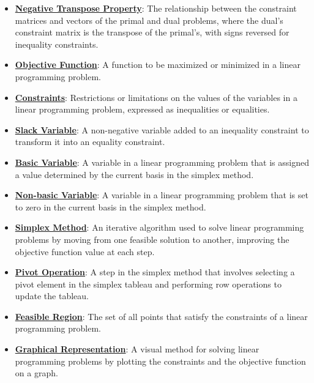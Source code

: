 \documentclass{article}%
\begin{document}
\begin{itemize}[leftmargin=*]
\item \href{https://www.math.purdue.edu/~yipn/421/2024-09-19-DualityExamples.pdf#page=1}{\textbf{Negative Transpose Property}}: The relationship between the constraint matrices and vectors of the primal and dual problems, where the dual's constraint matrix is the transpose of the primal's, with signs reversed for inequality constraints.%
\item \href{https://www.math.purdue.edu/~yipn/421/2024-09-24-SimplexMatrix.pdf#page=1}{\textbf{Objective Function}}: A function to be maximized or minimized in a linear programming problem. %
\item \href{https://www.math.purdue.edu/~yipn/421/2024-09-24-SimplexMatrix.pdf#page=1}{\textbf{Constraints}}: Restrictions or limitations on the values of the variables in a linear programming problem, expressed as inequalities or equalities. %
\item \href{https://www.math.purdue.edu/~yipn/421/2024-09-24-SimplexMatrix.pdf#page=1}{\textbf{Slack Variable}}: A non-negative variable added to an inequality constraint to transform it into an equality constraint. %
\item \href{https://www.math.purdue.edu/~yipn/421/2024-09-24-SimplexMatrix.pdf#page=4}{\textbf{Basic Variable}}: A variable in a linear programming problem that is assigned a value determined by the current basis in the simplex method. %
\item \href{https://www.math.purdue.edu/~yipn/421/2024-09-24-SimplexMatrix.pdf#page=4}{\textbf{Non{-}basic Variable}}: A variable in a linear programming problem that is set to zero in the current basis in the simplex method. %
\item \href{https://www.math.purdue.edu/~yipn/421/2024-09-24-SimplexMatrix.pdf#page=1}{\textbf{Simplex Method}}: An iterative algorithm used to solve linear programming problems by moving from one feasible solution to another, improving the objective function value at each step. %
\item \href{https://www.math.purdue.edu/~yipn/421/2024-09-24-SimplexMatrix.pdf#page=17}{\textbf{Pivot Operation}}: A step in the simplex method that involves selecting a pivot element in the simplex tableau and performing row operations to update the tableau. %
\item \href{https://www.math.purdue.edu/~yipn/421/2024-09-24-SimplexMatrix.pdf#page=16}{\textbf{Feasible Region}}: The set of all points that satisfy the constraints of a linear programming problem. %
\item \href{https://www.math.purdue.edu/~yipn/421/2024-09-24-SimplexMatrix.pdf#page=16}{\textbf{Graphical Representation}}: A visual method for solving linear programming problems by plotting the constraints and the objective function on a graph. %

\end{itemize}
\end{document}
